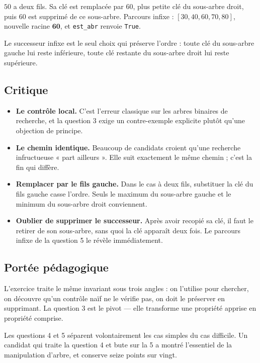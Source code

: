 $50$ a deux fils. Sa clé est remplacée par $60$, plus petite clé du sous-arbre
droit, puis $60$ est supprimé de ce sous-arbre. Parcours infixe :
$[30, 40, 60, 70, 80]$, nouvelle racine $\mathbf{60}$, et
\lstinline{est_abr} renvoie \lstinline{True}.

Le successeur infixe est le seul choix qui préserve l'ordre : toute clé du
sous-arbre gauche lui reste inférieure, toute clé restante du sous-arbre droit
lui reste supérieure.

\subsection*{Critique}

\begin{itemize}
  \item \textbf{Le contrôle local.} C'est l'erreur classique sur les arbres
    binaires de recherche, et la question 3 exige un contre-exemple explicite
    plutôt qu'une objection de principe.
  \item \textbf{Le chemin identique.} Beaucoup de candidats croient qu'une
    recherche infructueuse « part ailleurs ». Elle suit exactement le même
    chemin ; c'est la fin qui diffère.
  \item \textbf{Remplacer par le fils gauche.} Dans le cas à deux fils,
    substituer la clé du fils gauche casse l'ordre. Seuls le maximum du
    sous-arbre gauche et le minimum du sous-arbre droit conviennent.
  \item \textbf{Oublier de supprimer le successeur.} Après avoir recopié sa clé,
    il faut le retirer de son sous-arbre, sans quoi la clé apparaît deux fois.
    Le parcours infixe de la question 5 le révèle immédiatement.
\end{itemize}

\subsection*{Portée pédagogique}

L'exercice traite le même invariant sous trois angles : on l'utilise pour
chercher, on découvre qu'un contrôle naïf ne le vérifie pas, on doit le
préserver en supprimant. La question 3 est le pivot — elle transforme une
propriété apprise en propriété comprise.

Les questions 4 et 5 séparent volontairement les cas simples du cas difficile.
Un candidat qui traite la question 4 et bute sur la 5 a montré l'essentiel de la
manipulation d'arbre, et conserve seize points sur vingt.
